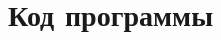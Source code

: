 
\newpage
\section{ Код программы}
\label{c:listings}

\renewcommand{\thelstlisting}{Г.1}

% 
\renewcommand{\thelstlisting}{Г.2}
% 
% 

